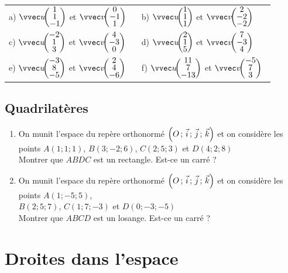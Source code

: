 \documentclass[oneside,12pt]{book}          %
\begin{document}
\begin{tabular}{p{0.45\linewidth}p{0.45\linewidth}}
	a) $\vcoord{u}{1\\1\\-1}$ et $\vcoord{v}{0\\-1\\1}$ & b) $\vcoord{u}{1\\1\\1}$ et $\vcoord{v}{2\\-2\\-2}$ \\[15pt]
	c) $\vcoord{u}{-2\\1\\3}$ et $\vcoord{v}{4\\-3\\0}$ & d) $\vcoord{u}{2\\1\\5}$ et $\vcoord{v}{7\\-3\\4}$ \\[15pt]
	e) $\vcoord{u}{-3\\8\\-5}$ et $\vcoord{v}{2\\4\\-6}$ & f) $\vcoord{u}{11\\7\\-13}$ et $\vcoord{v}{-5\\7\\3}$
\end{tabular}



\subsection{Quadrilatères}
\begin{enumerate}
	\item On munit l'espace du repère orthonormé $\left(O\,;\,\Vec{i}\,;\,\Vec{j}\,;\,\Vec{k}\right)$ et on considère les points $A(1;1;1)$, $B(3;-2;6)$, $C(2;5;3)$ et $D(4;2;8)$\\
	Montrer que $ABDC$ est un rectangle. Est-ce un carré ?
	\item On munit l'espace du repère orthonormé $\left(O\,;\,\Vec{i}\,;\,\Vec{j}\,;\,\Vec{k}\right)$ et on considère les points $A(1;-5;5)$, \\$B(2;5;7)$, $C(1;7;-3)$ et $D(0;-3;-5)$\\
	Montrer que $ABCD$ est un losange. Est-ce un carré ?
\end{enumerate}



\section{Droites dans l'espace}
\end{document}
